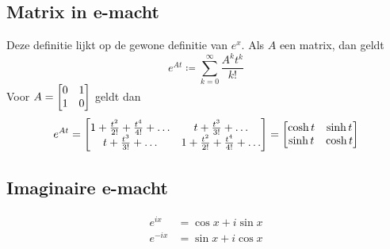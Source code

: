 \subsection{Matrix in e-macht}\label{subsec:matrixInE-macht}
Deze definitie lijkt op de gewone definitie van $e^x$.
Als $A$ een matrix, dan geldt
\[ e^{At} \coloneqq \sum_{k=0}^\infty \frac{A^k t^k}{k!} \]
Voor $\displaystyle A = \matrix{0 & 1 \\ 1 & 0}$ geldt dan
\[ e^{At} =
\matrix{1 + \frac{t^2}{2!} + \frac{t^4}{4!} + \dots & t + \frac{t^3}{3!} + \dots \\
t + \frac{t^3}{3!} + \dots & 1 + \frac{t^2}{2!} + \frac{t^4}{4!} + \dots}
= \matrix{\cosh t & \sinh t \\ \sinh t & \cosh t}\]
\subsection{Imaginaire e-macht}\label{subsec:imaginaireE-macht}
\begin{align*}
	e^{ix} &= \cos x + i \sin x \\
	e^{-ix} &= \sin x + i \cos x
\end{align*}